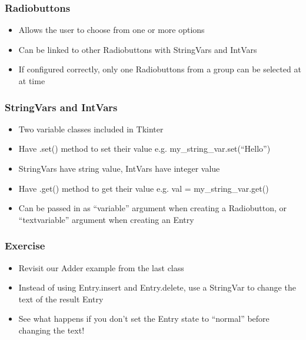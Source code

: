 \begin{frame}[fragile] \frametitle{Radiobuttons}
\begin{itemize}
\item Allows the user to choose from one or more options
\item Can be linked to other Radiobuttons with StringVars and IntVars
\item If configured correctly, only one Radiobuttons from a group can be selected at at time
\end{itemize}
\end{frame}

\begin{frame}[fragile] \frametitle{StringVars and IntVars}
\begin{itemize}
\item Two variable classes included in Tkinter
\item Have .set() method to set their value
e.g. my\_string\_var.set(``Hello'')
\item StringVars have string value, IntVars have integer value
\item Have .get() method to get their value
e.g. val = my\_string\_var.get()
\item Can be passed in as ``variable'' argument when creating a Radiobutton, or ``textvariable'' argument when creating an Entry

\end{itemize}
\end{frame}

\begin{frame}[fragile] \frametitle{Exercise}
\begin{itemize}
\item Revisit our Adder example from the last class
\item Instead of using Entry.insert and Entry.delete, use a StringVar to change the text of the result Entry
\item See what happens if you don't set the Entry state to ``normal'' before changing the text!
\end{itemize}
\end{frame}

